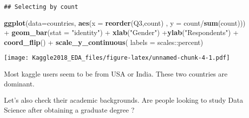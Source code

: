 \documentclass[]{article}
\newenvironment{Shaded}{\begin{snugshade}}{\end{snugshade}}
\newcommand{\KeywordTok}[1]{\textcolor[rgb]{0.13,0.29,0.53}{\textbf{{#1}}}}
\newcommand{\DataTypeTok}[1]{\textcolor[rgb]{0.13,0.29,0.53}{{#1}}}
\newcommand{\DecValTok}[1]{\textcolor[rgb]{0.00,0.00,0.81}{{#1}}}
\newcommand{\StringTok}[1]{\textcolor[rgb]{0.31,0.60,0.02}{{#1}}}
\newcommand{\NormalTok}[1]{{#1}}
\begin{document}
\begin{Shaded}
\end{Shaded}

\begin{verbatim}
## Selecting by count
\end{verbatim}

\begin{Shaded}
\begin{Highlighting}[]
\KeywordTok{ggplot}\NormalTok{(}\DataTypeTok{data=}\NormalTok{countries, }\KeywordTok{aes}\NormalTok{(}\DataTypeTok{x =} \KeywordTok{reorder}\NormalTok{(Q3,count) , }\DataTypeTok{y =} \NormalTok{count/}\KeywordTok{sum}\NormalTok{(count))) +}\StringTok{ }\KeywordTok{geom_bar}\NormalTok{(}\DataTypeTok{stat =} \StringTok{"identity"}\NormalTok{) +}\StringTok{ }\KeywordTok{xlab}\NormalTok{(}\StringTok{"Gender"}\NormalTok{) +}\KeywordTok{ylab}\NormalTok{(}\StringTok{"Respondents"}\NormalTok{)  +}\StringTok{ }\KeywordTok{coord_flip}\NormalTok{() +}\StringTok{ }\KeywordTok{scale_y_continuous}\NormalTok{( }\DataTypeTok{labels =} \NormalTok{scales::percent) }
\end{Highlighting}
\end{Shaded}

\texttt{[image: Kaggle2018\_EDA\_files/figure-latex/unnamed-chunk-4-1.pdf]}

Most kaggle users seem to be from USA or India. These two countries are
dominant.

Let's also check their academic backgrounds. Are people looking to study
Data Science after obtaining a graduate degree ?
\end{document}
